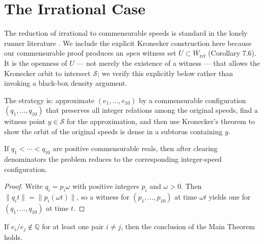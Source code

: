 \documentclass[12pt]{article}
\begin{document}
\section{The Irrational Case}

The reduction of irrational to commensurable speeds is standard in the lonely runner
literature \cite{KN74}. We include the explicit Kronecker construction here because our
commensurable proof produces an \emph{open} witness set $U\subset W_{\mathrm{ref}}$ (Corollary 7.6).
It is the openness of $U$ --- not merely the existence of a witness --- that allows the
Kronecker orbit to intersect $\mathcal{S}$; we verify this explicitly below rather than
invoking a black-box density argument.

The strategy is: approximate $(e_1,\ldots,e_{10})$ by a commensurable configuration
$(q_1,\ldots,q_{10})$ that preserves all integer relations among the original speeds,
find a witness point $y\in\mathcal{S}$ for the approximation, and then use Kronecker's
theorem to show the orbit of the original speeds is dense in a subtorus containing $y$.

\begin{lemma}\label{l:C1}
If $q_1<\cdots<q_{10}$ are positive commensurable reals, then after clearing denominators
the problem reduces to the corresponding integer-speed configuration.
\end{lemma}

\begin{proof}
Write $q_i=p_i\omega$ with positive integers $p_i$ and $\omega>0$. Then
$\|q_it\|=\|p_i(\omega t)\|$, so a witness for $(p_1,\ldots,p_{10})$ at time $\omega t$
yields one for $(q_1,\ldots,q_{10})$ at time $t$.
\end{proof}

\begin{proposition}\label{p:C2}
If $e_i/e_j\notin\mathbb{Q}$ for at least one pair $i\ne j$, then the conclusion of the
Main Theorem holds.
\end{proposition}
\end{document}
